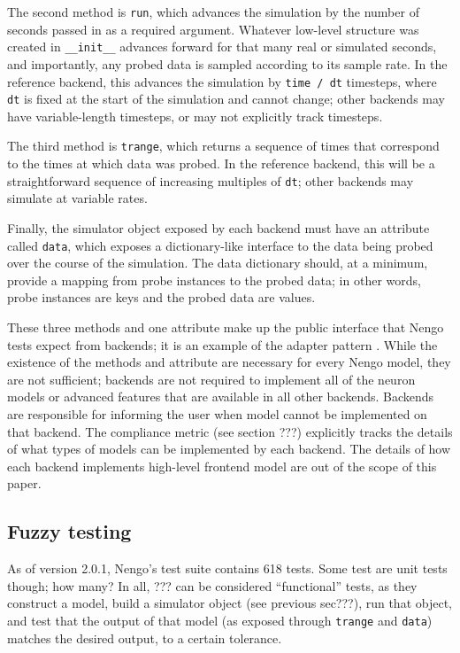\documentclass{frontiersSCNS}
\begin{document}
The second method is \texttt{run},
which advances the simulation
by the number of seconds
passed in as a required argument.
Whatever low-level structure was created
in \texttt{\_\_init\_\_} advances forward
for that many real or simulated seconds,
and importantly, any probed data is sampled
according to its sample rate.
In the reference backend,
this advances the simulation
by \texttt{time / dt} timesteps,
where \texttt{dt} is fixed at the start of the simulation
and cannot change;
other backends may have variable-length timesteps,
or may not explicitly track timesteps.

The third method is \texttt{trange},
which returns a sequence of times that correspond
to the times at which data was probed.
In the reference backend, this will be
a straightforward sequence of increasing
multiples of \texttt{dt};
other backends may simulate at variable rates.

Finally, the simulator object exposed by each backend
must have an attribute called \texttt{data},
which exposes a dictionary-like interface
to the data being probed over the course
of the simulation.
The data dictionary should,
at a minimum, provide a mapping from
probe instances to the probed data;
in other words, probe instances are keys
and the probed data are values.

These three methods and one attribute
make up the public interface
that Nengo tests expect from backends;
it is an example
of the adapter pattern \cite{???}. %
While the existence of the methods
and attribute are necessary
for every Nengo model,
they are not sufficient;
backends are not required
to implement all of the neuron models
or advanced features that
are available in all other backends.
Backends are responsible for informing
the user when model cannot be implemented
on that backend.
The compliance metric (see section ???)
explicitly tracks the details of what
types of models can be implemented
by each backend.
The details of how each backend
implements high-level frontend model
are out of the scope of this paper.

\subsection{Fuzzy testing}

As of version 2.0.1, Nengo's test suite contains 618 tests.
Some test are unit tests though; how many?
In all, ??? can be considered ``functional'' tests,
as they construct a model,
build a simulator object (see previous sec???),
run that object,
and test that the output of that model
(as exposed through \texttt{trange}
and \texttt{data})
matches the desired output,
to a certain tolerance.
\end{document}
